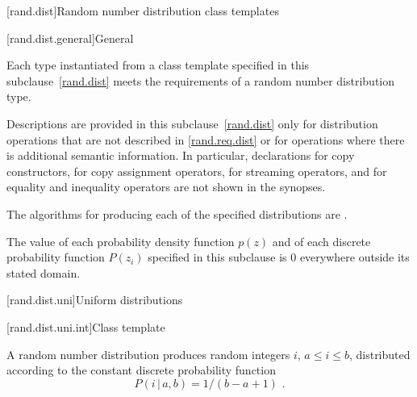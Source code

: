 



[rand.dist]{Random number distribution class templates}%

[rand.dist.general]{General}

\pnum
Each type instantiated
from a class template specified in this subclause~\ref{rand.dist}
meets the requirements
of a random number distribution type.

\pnum
Descriptions are provided in this subclause~\ref{rand.dist}
only for distribution operations
that are not described in \ref{rand.req.dist}
or for operations where there is additional semantic information.
In particular,
declarations for copy constructors,
for copy assignment operators,
for streaming operators,
and for equality and inequality operators
are not shown in the synopses.

\pnum
The algorithms for producing each
of the specified distributions are
.

\pnum
The value of each probability density function $p(z)$
and of each discrete probability function $P(z_i)$
specified in this subclause
is $0$
everywhere outside its stated domain.


[rand.dist.uni]{Uniform distributions}%
%


[rand.dist.uni.int]{Class template }%
%

\pnum
A  random number distribution
produces random integers $i$,
$a \leq i \leq b$,
distributed according to
the constant discrete probability function%
\[  P(i\,|\,a,b) = 1 / (b - a + 1) \text{ .} \]

